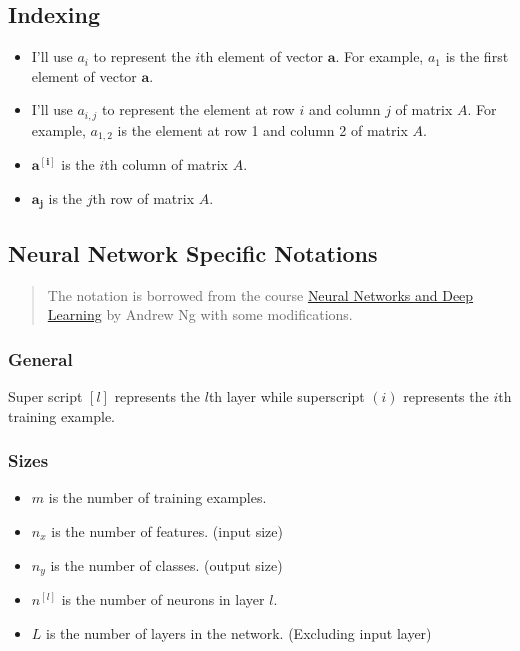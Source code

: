 \hypertarget{indexing}{%
\subsection{Indexing}\label{indexing}}

\begin{itemize}
\tightlist
\item
  I'll use \(a_i\) to represent the \(i\)th element of vector
  \(\mathbf{a}\). For example, \(a_1\) is the first element of vector
  \(\mathbf{a}\).
\item
  I'll use \(a_{i,j}\) to represent the element at row \(i\) and column
  \(j\) of matrix \(A\). For example, \(a_{1,2}\) is the element at row
  1 and column 2 of matrix \(A\).
\item
  \(\mathbf{a^{[i]}}\) is the \(i\)th column of matrix \(A\).
\item
  \(\mathbf{a_j}\) is the \(j\)th row of matrix \(A\).
\end{itemize}

\hypertarget{neural-network-specific-notations}{%
\subsection{Neural Network Specific
Notations}\label{neural-network-specific-notations}}

\begin{quote}
The notation is borrowed from the course
\href{https://www.coursera.org/learn/neural-networks-deep-learning}{Neural
Networks and Deep Learning} by Andrew Ng with some modifications.
\end{quote}

\hypertarget{general}{%
\subsubsection{General}\label{general}}

Super script \([l]\) represents the \(l\)th layer while superscript
\((i)\) represents the \(i\)th training example.

\hypertarget{sizes}{%
\subsubsection{Sizes}\label{sizes}}

\begin{itemize}
\tightlist
\item
  \(m\) is the number of training examples.
\item
  \(n_x\) is the number of features. (input size)
\item
  \(n_y\) is the number of classes. (output size)
\item
  \(n^{[l]}\) is the number of neurons in layer \(l\).
\item
  \(L\) is the number of layers in the network. (Excluding input layer)
\end{itemize}

